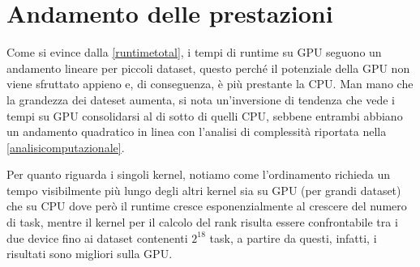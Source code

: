 \section{Andamento delle prestazioni}
Come si evince dalla \autoref{runtimetotal}, i tempi di runtime su GPU seguono un andamento lineare per piccoli dataset, questo perché il potenziale della GPU non viene sfruttato appieno e, di conseguenza, è più prestante la CPU.
Man mano che la grandezza dei dateset aumenta, si nota un'inversione di tendenza che vede i tempi su GPU consolidarsi al di sotto di quelli CPU, sebbene entrambi abbiano un andamento quadratico in linea con l'analisi di complessità riportata nella \autoref{analisicomputazionale}.

Per quanto riguarda i singoli kernel, notiamo come l'ordinamento richieda un tempo visibilmente più lungo degli altri kernel sia su GPU (per grandi dataset) che su CPU dove però il runtime cresce esponenzialmente al crescere del numero di task, mentre il kernel per il calcolo del rank risulta essere confrontabile tra i due device fino ai dataset contenenti $2^{18}$ task, a partire da questi, infatti, i risultati sono migliori sulla GPU.
